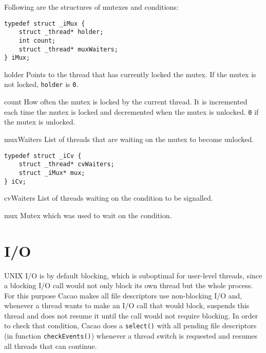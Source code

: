 \documentclass[twocolumn,a4paper]{article}      %
\newcommand{\structdesclabel}[1]{\mbox{\texttt{#1}}\hfil}
\newenvironment{structdesc}
    {\begin{list}{}%
           {\renewcommand{\makelabel}{\structdesclabel}%
           }%
    }%
    {\end{list}}
\begin{document}
Following are the structures of mutexes and conditions:

\begin{verbatim}
typedef struct _iMux {
    struct _thread* holder;
    int count;
    struct _thread* muxWaiters;
} iMux;
\end{verbatim}

\begin{structdesc}

\item[holder] Points to the thread that has currently locked the mutex. If the mutex is not
    locked, \texttt{holder} is \texttt{0}.

\item[count] How often the mutex is locked by the current thread. It is incremented each time
    the mutex is locked and decremented when the mutex is
    unlocked. \texttt{0} if the mutex is unlocked.

\item[muxWaiters] List of threads that are waiting on the mutex to become unlocked.

\end{structdesc}

\begin{verbatim}
typedef struct _iCv {
    struct _thread* cvWaiters;
    struct _iMux* mux;
} iCv;
\end{verbatim}

\begin{structdesc}

\item[cvWaiters] List of threads waiting on the condition to be signalled.

\item[mux] Mutex which was used to wait on the condition.

\end{structdesc}

\section{I/O}
\label{sec:io}

UNIX I/O is by default blocking, which is suboptimal for user-level
threads, since a blocking I/O call would not only block its own thread
but the whole process. For this purpose Cacao makes all file
descriptors use non-blocking I/O and, whenever a thread wants to make
an I/O call that would block, suspends this thread and does not resume
it until the call would not require blocking. In order to check that
condition, Cacao does a \texttt{select()} with all pending file
descriptors (in function \texttt{checkEvents()}) whenever a thread
switch is requested and resumes all threads that can continue.
\end{document}

